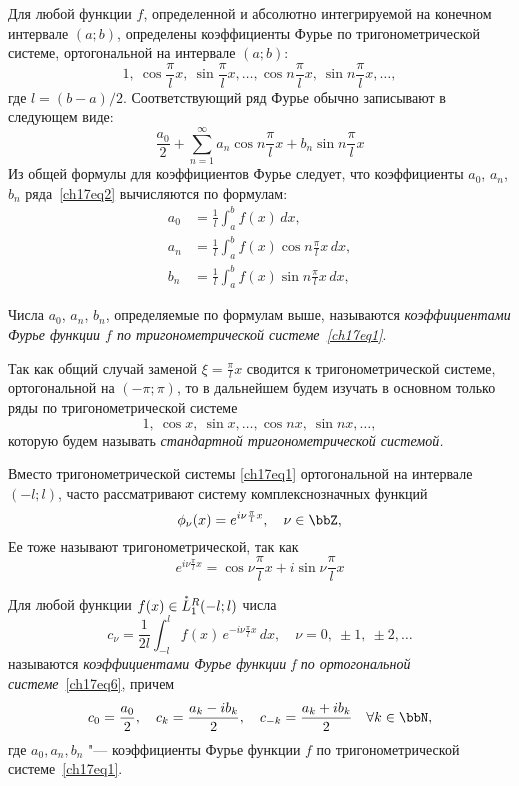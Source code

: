 Для любой функции $f$, определенной и абсолютно интегрируемой на конечном интервале $(a;b)$, определены коэффициенты Фурье по тригонометрической системе, ортогональной на интервале $(a;b)$:
\begin{equation} \label{ch17eq1}
1,\ \cos \frac{\pi}{l}x,\ \sin \frac{\pi}{l}x,\ldots,\cos n\frac{\pi}{l}x,\ \sin n\frac{\pi}{l}x,\ldots,
\end{equation}
где $l = (b - a)/2$. Соответствующий ряд Фурье обычно записывают в следующем виде:
\begin{equation} \label{ch17eq2}
\frac{a_0}{2} + \sum_{n = 1}^{\infty} a_{n} \cos n\frac{\pi}{l}x + b_{n} \sin n\frac{\pi}{l}x
\end{equation}
Из общей формулы для коэффициентов Фурье следует, что коэффициенты $a_0$, $a_n$, $b_n$ ряда~\eqref{ch17eq2} вычисляются по формулам:
\begin{align} \label{ch17eq3}
a_0 &= \frac{1}{l} \int_{a}^{b} f(x)\,dx,\\
a_n &= \frac{1}{l} \int_{a}^{b} f(x)\cos n\frac{\pi}{l}x\, dx,\\
b_n &= \frac{1}{l} \int_{a}^{b} f(x)\sin n\frac{\pi}{l}x\, dx,
\end{align}

\begin{defn}
Числа $a_0$, $a_n$, $b_n$, определяемые по формулам выше, называются \textit{коэффициентами Фурье функции $f$ по тригонометрической системе~\eqref{ch17eq1}}.
\end{defn}

Так как общий случай заменой $\xi = \frac{\pi}{l} x$ сводится к тригонометрической системе, ортогональной на $(-\pi;\pi)$, то в дальнейшем будем изучать в основном только ряды по тригонометрической системе
$$
1,\ \cos x,\ \sin x,\ldots,\cos nx,\ \sin nx,\ldots,
$$
которую будем называть \textit{стандартной тригонометрической системой.}

Вместо тригонометрической системы \eqref{ch17eq1} ортогональной на интервале $(-l;l)$, часто рассматривают систему комплекснозначных функций
\begin{equation} \label{ch17eq6}
\phi_{\nu}(x) = e^{i\nu\frac{\pi}{l}x},\quad \nu \in \bbZ,
\end{equation}
Ее тоже называют тригонометрической, так как
$$
e^{i\nu\frac{\pi}{l}x} = \cos \nu\frac{\pi}{l}x + i \sin \nu\frac{\pi}{l}x
$$
\begin{defn}
Для любой функции $f(x) \in \accentset{*}{L}^{R}_1(-l;l)$ числа
\begin{equation}
c_{\nu} = \frac{1}{2l} \int_{-l}^{l} f(x)\, e^{-i\nu\frac{\pi}{l}x}\,dx,\quad \nu = 0,\ \pm 1,\ \pm 2,\ldots
\end{equation}
называются \textit{коэффициентами Фурье функции f по ортогональной системе}~\eqref{ch17eq6}, причем
\begin{equation}
c_0 = \frac{a_0}{2}, \quad c_{k} = \frac{a_k - ib_k}{2}, \quad c_{-k} = \frac{a_k + ib_k}{2} \quad \forall k \in \bbN,
\end{equation}
где $a_0, a_n, b_n$ "--- коэффициенты Фурье функции $f$ по тригонометрической системе~\eqref{ch17eq1}.
\end{defn}

